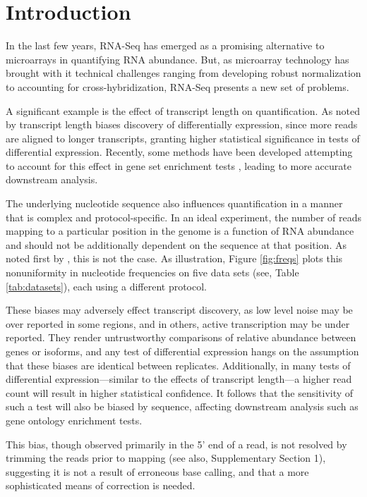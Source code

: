 \documentclass{bioinfo}
\begin{document}
\section{Introduction}

In the last few years, RNA-Seq has emerged as a promising alternative to
microarrays in quantifying RNA abundance. But, as microarray technology has
brought with it technical challenges ranging from developing robust
normalization to accounting for cross-hybridization, RNA-Seq presents a new set
of problems.

A significant example is the effect of transcript length on quantification.  As
noted by \citet{Oshlack2009} transcript length biases discovery of
differentially expression, since more reads are aligned to longer transcripts,
granting higher statistical significance in tests of differential expression.
Recently, some methods have been developed attempting to account for this effect
in gene set enrichment tests \citep{Young2010,Gao2011}, leading to more accurate
downstream analysis.

The underlying nucleotide sequence also influences quantification in a manner
that is complex and protocol-specific. In an ideal experiment, the number of
reads mapping to a particular position in the genome is a function of RNA
abundance and should not be additionally dependent on the sequence at that
position. As noted first by \citet{Dohm2008}, this is not the case.  As
illustration, Figure \ref{fig:freqs} plots this nonuniformity in nucleotide
frequencies on five data sets (see, Table \ref{tab:datasets}), each using a
different protocol.


These biases may adversely effect transcript discovery, as low level noise may
be over reported in some regions, and in others, active transcription may be
under reported. They render untrustworthy comparisons of relative abundance
between genes or isoforms, and any test of differential expression hangs on the
assumption that these biases are identical between replicates.  Additionally, in
many tests of differential expression---similar to the effects of transcript
length---a higher read count will result in higher statistical confidence. It
follows that the sensitivity of such a test will also be biased by sequence,
affecting downstream analysis such as gene ontology enrichment tests.

This bias, though observed primarily in the 5' end of a read, is not resolved by
trimming the reads prior to mapping \citep{Hansen2010} (see also, Supplementary
Section 1), suggesting it is not a result of erroneous base calling, and that a
more sophisticated means of correction is needed.
\end{document}
